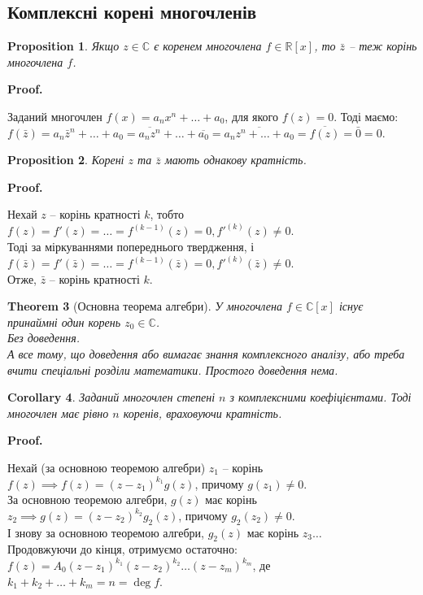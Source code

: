 \documentclass[a4paper, 10pt]{extarticle}
\makeatletter
\def\qed{$\blacksquare$}
\def\qed{$\blacksquare$}
\theoremstyle{theoremdd}
\newtheorem{theorem}{Theorem}[subsection]
\theoremstyle{theoremdd}
\theoremstyle{theoremdd}
\theoremstyle{theoremdd}
\theoremstyle{theoremdd}
\newtheorem{proposition}[theorem]{Proposition}
\theoremstyle{theoremdd}
\theoremstyle{theoremdd}
\theoremstyle{theoremdd}
\newtheorem{corollary}[theorem]{Corollary}
\renewenvironment{proof}[1][Proof.\\]{\par
\pushQED{\hfill \qed}%
\normalfont \topsep6\p@\@plus6\p@\relax
\trivlist
\item\relax
{\bfseries
#1\@addpunct{.}}\hspace\labelsep\ignorespaces
}{%
\popQED\endtrivlist\@endpefalse
}
\makeatother
\begin{document}
\subsection{Комплексні корені многочленів}
\begin{proposition}
Якщо $z \in \mathbb{C}$ є коренем многочлена $f \in \mathbb{R}[x]$, то $\bar{z}$ -- теж корінь многочлена $f$.
\end{proposition}

\begin{proof}
Заданий многочлен $f(x) = a_n x^n + \dots + a_0$, для якого $f(z) = 0$. Тоді маємо:\\
$f(\bar{z}) = a_n \bar{z}^n + \dots + a_0 = \overline{a_n z^n} + \dots + \overline{a_0} = \overline{a_n z^n + \dots + a_0} = \overline{f(z)} = \bar{0} = 0$.
\end{proof}

\begin{proposition}
Корені $z$ та $\bar{z}$ мають однакову кратність.
\end{proposition}

\begin{proof}
Нехай $z$ -- корінь кратності $k$, тобто $f(z) = f'(z) = \dots = f^{(k-1)}(z) = 0, f'^{(k)}(z) \neq 0$.\\
Тоді за міркуваннями попереднього твердження, і$f(\bar{z}) = f'(\bar{z}) = \dots = f^{(k-1)}(\bar{z}) = 0, f'^{(k)}(\bar{z}) \neq 0$. \\ Отже, $\bar{z}$ -- корінь кратності $k$.
\end{proof}

\begin{theorem}[Основна теорема алгебри]
У многочлена $f \in \mathbb{C}[x]$ існує принаймні один корень $z_0 \in \mathbb{C}$.\\
\textit{Без доведення.}\\
\textit{А все тому, що доведення або вимагає знання комплексного аналізу, або треба вчити спеціальні розділи математики. Простого доведення нема.}
\end{theorem}

\begin{corollary}
Заданий многочлен степені $n$ з комплексними коефіцієнтами. Тоді многочлен має рівно $n$ коренів, враховуючи кратність.
\end{corollary}

\begin{proof}
Нехай (за основною теоремою алгебри) $z_1$ -- корінь $f(z) \implies f(z) = (z-z_1)^{k_1} g(z)$, причому $g(z_1) \neq 0$.\\
За основною теоремою алгебри, $g(z)$ має корінь $z_2 \implies g(z) = (z-z_2)^{k_2} g_2(z)$, причому $g_2(z_2) \neq 0$.\\
І знову за основною теоремою алгебри, $g_2(z)$ має корінь $z_3\dots$\\
Продовжуючи до кінця, отримуємо остаточно:\\
$f(z) = A_0(z-z_1)^{k_1}(z-z_2)^{k_2}\dots(z-z_m)^{k_m}$, де \hspace{0.5cm} $k_1 + k_2 + \dots + k_m = n = \deg f$.
\end{proof}
\end{document}
